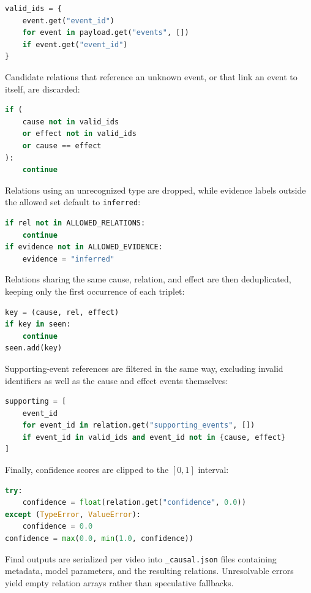 \begin{lstlisting}[language=Python]
valid_ids = {
    event.get("event_id")
    for event in payload.get("events", [])
    if event.get("event_id")
}
\end{lstlisting}
Candidate relations that reference an unknown event, or that link an event to itself, are discarded:
\begin{lstlisting}[language=Python]
if (
    cause not in valid_ids
    or effect not in valid_ids
    or cause == effect
):
    continue
\end{lstlisting}
Relations using an unrecognized type are dropped, while evidence labels outside the allowed set default to \texttt{inferred}:
\begin{lstlisting}[language=Python]
if rel not in ALLOWED_RELATIONS:
    continue
if evidence not in ALLOWED_EVIDENCE:
    evidence = "inferred"
\end{lstlisting}
Relations sharing the same cause, relation, and effect are then deduplicated, keeping only the first occurrence of each triplet:
\begin{lstlisting}[language=Python]
key = (cause, rel, effect)
if key in seen:
    continue
seen.add(key)
\end{lstlisting}
Supporting-event references are filtered in the same way, excluding invalid identifiers as well as the cause and effect events themselves:
\begin{lstlisting}[language=Python]
supporting = [
    event_id
    for event_id in relation.get("supporting_events", [])
    if event_id in valid_ids and event_id not in {cause, effect}
]
\end{lstlisting}
Finally, confidence scores are clipped to the $[0, 1]$ interval:
\begin{lstlisting}[language=Python]
try:
    confidence = float(relation.get("confidence", 0.0))
except (TypeError, ValueError):
    confidence = 0.0
confidence = max(0.0, min(1.0, confidence))
\end{lstlisting}
Final outputs are serialized per video into \texttt{\_causal.json} files containing metadata, model parameters, and the resulting relations. Unresolvable errors yield empty relation arrays rather than speculative fallbacks.

